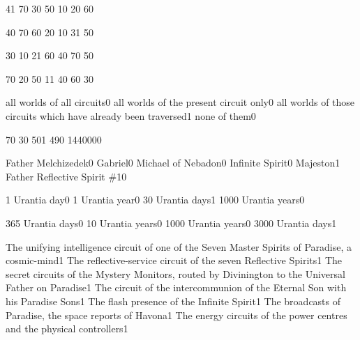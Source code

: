 {4}{1}
{7}{0}
{3}{0}
{5}{0}
{1}{0}
{2}{0}
{6}{0}
\qstop

{4}{0}
{7}{0}
{6}{0}
{2}{0}
{1}{0}
{3}{1}
{5}{0}
\qstop

{3}{0}
{1}{0}
{2}{1}
{6}{0}
{4}{0}
{7}{0}
{5}{0}
\qstop

{7}{0}
{2}{0}
{5}{0}
{1}{1}
{4}{0}
{6}{0}
{3}{0}
\qstop

{all worlds of all circuits}{0}
{all worlds of the present circuit only}{0}
{all worlds of those circuits which have already been traversed}{1}
{none of them}{0}
\qstop


{7}{0}
{3}{0}
{50}{1}
{49}{0}
{144000}{0}
\qstop

{Father Melchizedek}{0}
{Gabriel}{0}
{Michael of Nebadon}{0}
{Infinite Spirit}{0}
{Majeston}{1}
{Father Reflective Spirit \#1}{0}
\qstop

{1 Urantia day}{0}
{1 Urantia year}{0}
{30 Urantia days}{1}
{1000 Urantia years}{0}
\qstop

{365 Urantia days}{0}
{10 Urantia years}{0}
{1000 Urantia years}{0}
{3000 Urantia days}{1}
\qstop

{The unifying intelligence circuit of one of the Seven Master Spirits of Paradise, a cosmic-mind}{1}
{The reflective-service circuit of the seven Reflective Spirits}{1}
{The secret circuits of the Mystery Monitors, routed by Divinington to the Universal Father on Paradise}{1}
{The circuit of the intercommunion of the Eternal Son with his Paradise Sons}{1}
{The flash presence of the Infinite Spirit}{1}
{The broadcasts of Paradise, the space reports of Havona}{1}
{The energy circuits of the power centres and the physical controllers}{1}
\qstop

